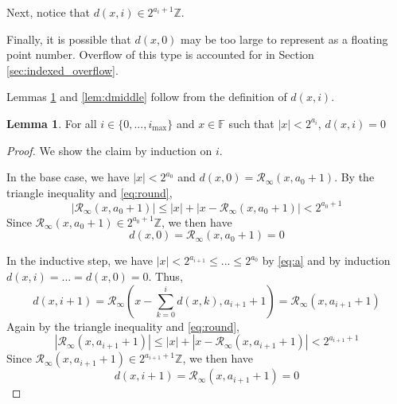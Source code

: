 \documentclass[12pt]{article}
\providecommand{\F}{\ensuremath{\mathbb{F}}}
\providecommand{\Z}{\ensuremath{\mathbb{Z}}}
\providecommand{\max}{\ensuremath{\text{max}}}
\providecommand{\roundtonearestinfty}{\ensuremath{\mathcal{R}_\text{$\infty$}}}
\theoremstyle{definition}
\newtheorem{lem}[thm]{Lemma}
\numberwithin{equation}{section}
\numberwithin{figure}{section}
\begin{document}
    Next, notice that $d(x, i) \in 2^{a_{i} + 1}\Z$.

    Finally, it is possible that $d(x, 0)$ may be too large to represent as a floating point number. Overflow of this type is accounted for in Section \ref{sec:indexed_overflow}.

    Lemmas \ref{lem:dzero} and \ref{lem:dmiddle} follow from the definition of $d(x, i)$.

    \begin{samepage}
    \begin{lem}
      For all $i \in \{0, ..., i_{\max}\}$ and $x \in \F$ such that $|x| < 2^{a_i}$, $d(x, i) = 0$
      \label{lem:dzero}
    \end{lem}
    \end{samepage}

    \begin{proof}
      We show the claim by induction on $i$.

      In the base case, we have $|x| < 2^{a_0}$ and $d(x, 0) = \roundtonearestinfty(x, a_0 + 1)$. By the triangle inequality and  \eqref{eq:round},
      \begin{equation*}
        |\roundtonearestinfty(x, a_0 + 1)| \leq |x| + |x - \roundtonearestinfty(x, a_0 + 1)| < 2^{a_0 + 1}
      \end{equation*}
      Since $\roundtonearestinfty(x, a_0 + 1) \in 2^{a_0 + 1}\Z$, we then have
      \begin{equation*}
        d(x, 0) = \roundtonearestinfty(x, a_0 + 1) = 0
      \end{equation*}

      In the inductive step, we have $|x| < 2^{a_{i + 1}} \leq ... \leq 2^{a_0}$ by  \eqref{eq:a} and by induction $d(x, i)= ... = d(x, 0) = 0$. Thus,
      \begin{equation*}
        d(x, i + 1) = \roundtonearestinfty(x - \sum\limits_{k = 0}^{i}d(x, k), a_{i + 1} + 1) = \roundtonearestinfty(x, a_{i+1} + 1)
      \end{equation*}
      Again by the triangle inequality and  \eqref{eq:round},
      \begin{equation*}
        |\roundtonearestinfty(x, a_{i + 1} + 1)| \leq |x| + |x - \roundtonearestinfty(x, a_{i + 1} + 1)| < 2^{a_{i + 1} + 1}
      \end{equation*}
      Since $\roundtonearestinfty(x, a_{i + 1} + 1) \in 2^{a_{i + 1} + 1}\Z$, we then have
      \begin{equation*}
        d(x, i + 1) = \roundtonearestinfty(x, a_{i + 1} + 1) = 0
      \end{equation*}
    \end{proof}
\end{document}
